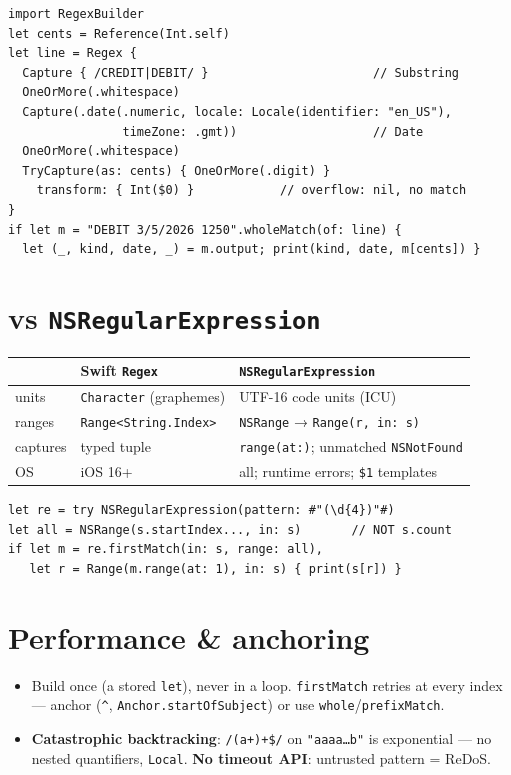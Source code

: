 \documentclass[8pt]{extarticle}
\begin{document}
\begin{multicols}{2}
\begin{lstlisting}[language=SwiftSheet]
import RegexBuilder
let cents = Reference(Int.self)
let line = Regex {
  Capture { /CREDIT|DEBIT/ }                       // Substring
  OneOrMore(.whitespace)
  Capture(.date(.numeric, locale: Locale(identifier: "en_US"),
                timeZone: .gmt))                   // Date
  OneOrMore(.whitespace)
  TryCapture(as: cents) { OneOrMore(.digit) }
    transform: { Int($0) }            // overflow: nil, no match
}
if let m = "DEBIT 3/5/2026 1250".wholeMatch(of: line) {
  let (_, kind, date, _) = m.output; print(kind, date, m[cents]) }
\end{lstlisting}

\columnbreak

\section{vs \texttt{NSRegularExpression}}
{\footnotesize
\begin{tabular}{@{}L{11mm}L{27mm}L{35mm}@{}}
\toprule
 & \textbf{Swift \texttt{Regex}} & \textbf{\texttt{NSRegularExpression}} \\
\midrule
units & \texttt{Character} (graphemes) & UTF-16 code units (ICU) \\
ranges & \texttt{Range<String.Index>} & \texttt{NSRange} → \texttt{Range(r, in: s)} \\
captures & typed tuple & \texttt{range(at:)}; unmatched \texttt{NSNotFound} \\
OS & iOS 16+ & all; runtime errors; \texttt{\$1} templates \\
\bottomrule
\end{tabular}}
\begin{lstlisting}[language=SwiftSheet]
let re = try NSRegularExpression(pattern: #"(\d{4})"#)
let all = NSRange(s.startIndex..., in: s)       // NOT s.count
if let m = re.firstMatch(in: s, range: all),
   let r = Range(m.range(at: 1), in: s) { print(s[r]) }
\end{lstlisting}

\section{Performance \& anchoring}
\begin{itemize}
  \item Build once (a stored \texttt{let}), never in a loop.
        \texttt{firstMatch} retries at every index — anchor (\texttt{\^{}},
        \texttt{Anchor.startOfSubject}) or use \texttt{whole}/\texttt{prefixMatch}.
  \item \textbf{Catastrophic backtracking}: \texttt{/(a+)+\$/} on
        \texttt{"aaaa…b"} is exponential — no nested quantifiers,
        \texttt{Local}. \textbf{No timeout API}: untrusted pattern = ReDoS.
\end{itemize}


\end{multicols}
\end{document}
